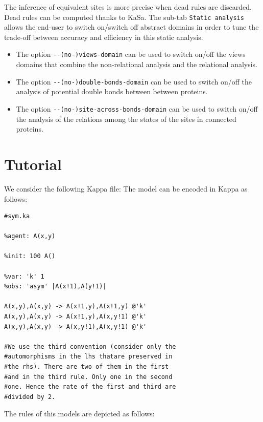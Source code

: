 \documentclass[11pt]{book}
\def\KaSa{\textsf{KaSa}}
\begin{document}
The inference of equivalent sites is more precise when dead rules are discarded. Dead rules can be computed thanks to {\KaSa}. The sub-tab \texttt{Static analysis} allows the end-user to switch on/switch off abstract domains in order to tune the trade-off between accuracy and efficiency in this static analysis.

\begin{itemize}
\item The option \verb?--(no-)views-domain? can be used to switch on/off the views domains that combine the non-relational analysis and the relational analysis.

\item The option \verb?--(no-)double-bonds-domain? can be used to switch on/off the analysis of potential double bonds between between proteins.

\item The option \verb?--(no-)site-across-bonds-domain? can be used to switch on/off the analysis of the relations among the states of the sites in connected proteins.
\end{itemize}

\section{Tutorial}

We consider the following Kappa file:
The model can be encoded in Kappa as follows:
\begin{lstlisting}[language=kappa]
#sym.ka

%agent: A(x,y)

%init: 100 A()

%var: 'k' 1
%obs: 'asym' |A(x!1),A(y!1)|

A(x,y),A(x,y) -> A(x!1,y),A(x!1,y) @'k'
A(x,y),A(x,y) -> A(x!1,y),A(x,y!1) @'k'
A(x,y),A(x,y) -> A(x,y!1),A(x,y!1) @'k'

#We use the third convention (consider only the
#automorphisms in the lhs thatare preserved in
#the rhs). There are two of them in the first
#and in the third rule. Only one in the second
#one. Hence the rate of the first and third are
#divided by 2.
\end{lstlisting}

The rules of this models are depicted as follows:
\end{document}
